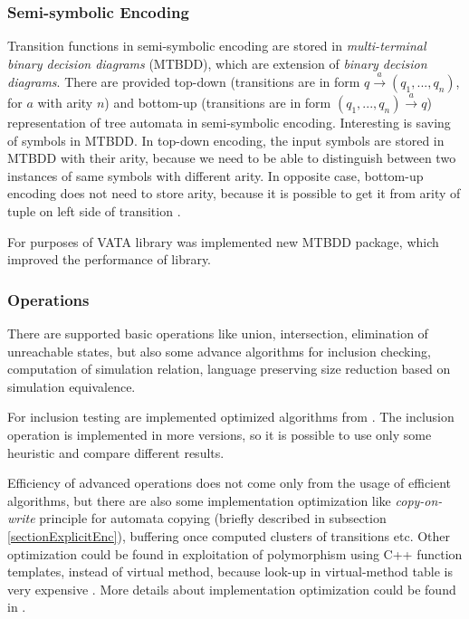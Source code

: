 \subsubsection{Semi-symbolic Encoding}
Transition functions in semi-symbolic encoding are stored in \emph{multi-terminal binary decision diagrams} (MTBDD), which are extension of \emph{binary decision 
diagrams}. There are provided top-down (transitions are in form $q \xrightarrow{a} (q_1,...,q_n)$, for $a$ with arity $n$) 
and bottom-up (transitions are in form $(q_1,...,q_n)\xrightarrow{a}q$) representation of tree automata in semi-symbolic encoding. 
Interesting is saving of symbols in MTBDD. In top-down encoding, the input
symbols are stored in MTBDD with their arity, because we need to be able to distinguish between two instances of same symbols with different arity.
In opposite case, bottom-up encoding does not need to store arity, because it is possible to get it from arity of tuple on left side of transition \cite{libvata}.

For purposes of VATA library was implemented new MTBDD package, which improved the performance of library.


\subsubsection{Operations}
There are supported basic operations like union, intersection, elimination of unreachable states, but also some advance algorithms for inclusion checking, 
computation of simulation relation, language preserving size reduction based on simulation equivalence. 

For inclusion testing are implemented optimized algorithms from \cite{cav06,tacas10}. The inclusion operation is implemented in more versions, so it is possible
to use only some heuristic and compare different results.

Efficiency of advanced operations does not come only from the usage of efficient algorithms, 
but there are also some implementation optimization like \emph{copy-on-write}
principle for automata copying (briefly described in subsection \ref{sectionExplicitEnc}), buffering once computed clusters of transitions etc. 
Other optimization could be found in exploitation of polymorphism using C++ function templates, instead of
virtual method, because look-up in virtual-method table is very expensive \cite{libvata}.
More details about implementation optimization could be found in \cite{libvata}.

